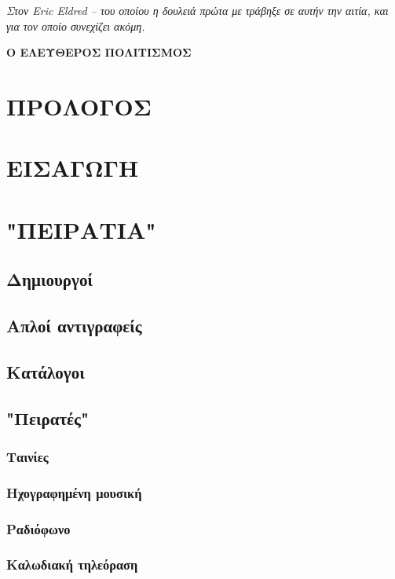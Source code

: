 \documentclass[a5paper,11pt]{book}
\begin{document}

\thispagestyle{empty}

\frontmatter



\null \newpage

\thispagestyle{empty}
\null \vspace{35pt}
\textit{Στον Eric Eldred -- του οποίου η δουλειά πρώτα με τράβηξε σε αυτήν την αιτία, και για τον οποίο συνεχίζει ακόμη.
}

\newpage
\textbf{Ο ΕΛΕΥΘΕΡΟΣ ΠΟΛΙΤΙΣΜΟΣ}


\tableofcontents

\chapter{ΠΡΟΛΟΓΟΣ}


\chapter{ΕΙΣΑΓΩΓΗ}


\mainmatter
\chapter{"ΠΕΙΡΑΤΙΑ"}
\section{Δημιουργοί}
\section{Απλοί αντιγραφείς}
\section{Κατάλογοι}
\section{"Πειρατές"}
\subsection{Ταινίες}
\subsection{Ηχογραφημένη μουσική}
\subsection{Ραδιόφωνο}
\subsection{Καλωδιακή τηλεόραση}

\backmatter
\end{document}
